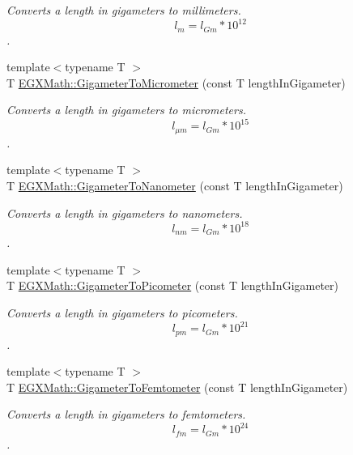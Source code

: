 \begin{DoxyCompactItemize}
\begin{DoxyCompactList}\small\item\em Converts a length in gigameters to millimeters. \[ l_{m}=l_{Gm} * 10^{12} \]. \end{DoxyCompactList}\item 
{\footnotesize template$<$typename T $>$ }\\T \mbox{\hyperlink{group___e_g_x_math-_conversions-_length_conversions-_gigameter-_s_i_ga02f73d15581b1cd69a79b843186211f5}{E\+G\+X\+Math\+::\+Gigameter\+To\+Micrometer}} (const T length\+In\+Gigameter)
\begin{DoxyCompactList}\small\item\em Converts a length in gigameters to micrometers. \[ l_{\mu m}=l_{Gm} * 10^{15} \]. \end{DoxyCompactList}\item 
{\footnotesize template$<$typename T $>$ }\\T \mbox{\hyperlink{group___e_g_x_math-_conversions-_length_conversions-_gigameter-_s_i_ga6538a7007f104833aa7ad690156342b5}{E\+G\+X\+Math\+::\+Gigameter\+To\+Nanometer}} (const T length\+In\+Gigameter)
\begin{DoxyCompactList}\small\item\em Converts a length in gigameters to nanometers. \[ l_{nm}=l_{Gm} * 10^{18} \]. \end{DoxyCompactList}\item 
{\footnotesize template$<$typename T $>$ }\\T \mbox{\hyperlink{group___e_g_x_math-_conversions-_length_conversions-_gigameter-_s_i_gae9cea35a0ce747d02ec8b6cf7bfeaa7e}{E\+G\+X\+Math\+::\+Gigameter\+To\+Picometer}} (const T length\+In\+Gigameter)
\begin{DoxyCompactList}\small\item\em Converts a length in gigameters to picometers. \[ l_{pm}=l_{Gm} * 10^{21} \]. \end{DoxyCompactList}\item 
{\footnotesize template$<$typename T $>$ }\\T \mbox{\hyperlink{group___e_g_x_math-_conversions-_length_conversions-_gigameter-_s_i_ga6701fe7aa809ca67fef5d4f9bf7b241c}{E\+G\+X\+Math\+::\+Gigameter\+To\+Femtometer}} (const T length\+In\+Gigameter)
\begin{DoxyCompactList}\small\item\em Converts a length in gigameters to femtometers. \[ l_{fm}=l_{Gm} * 10^{24} \]. \end{DoxyCompactList}\item 

\end{DoxyCompactItemize}
